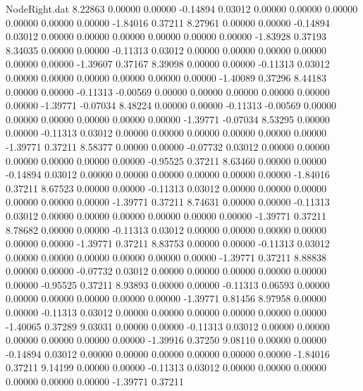 \begin{filecontents}{NodeRight.dat}
   8.22863    0.00000    0.00000    -0.14894    0.03012    0.00000    0.00000    0.00000    0.00000    0.00000    0.00000   -1.84016    0.37211
   8.27961    0.00000    0.00000    -0.14894    0.03012    0.00000    0.00000    0.00000    0.00000    0.00000    0.00000   -1.83928    0.37193
   8.34035    0.00000    0.00000    -0.11313    0.03012    0.00000    0.00000    0.00000    0.00000    0.00000    0.00000   -1.39607    0.37167
   8.39098    0.00000    0.00000    -0.11313    0.03012    0.00000    0.00000    0.00000    0.00000    0.00000    0.00000   -1.40089    0.37296
   8.44183    0.00000    0.00000    -0.11313   -0.00569    0.00000    0.00000    0.00000    0.00000    0.00000    0.00000   -1.39771   -0.07034
   8.48224    0.00000    0.00000    -0.11313   -0.00569    0.00000    0.00000    0.00000    0.00000    0.00000    0.00000   -1.39771   -0.07034
   8.53295    0.00000    0.00000    -0.11313    0.03012    0.00000    0.00000    0.00000    0.00000    0.00000    0.00000   -1.39771    0.37211
   8.58377    0.00000    0.00000    -0.07732    0.03012    0.00000    0.00000    0.00000    0.00000    0.00000    0.00000   -0.95525    0.37211
   8.63460    0.00000    0.00000    -0.14894    0.03012    0.00000    0.00000    0.00000    0.00000    0.00000    0.00000   -1.84016    0.37211
   8.67523    0.00000    0.00000    -0.11313    0.03012    0.00000    0.00000    0.00000    0.00000    0.00000    0.00000   -1.39771    0.37211
   8.74631    0.00000    0.00000    -0.11313    0.03012    0.00000    0.00000    0.00000    0.00000    0.00000    0.00000   -1.39771    0.37211
   8.78682    0.00000    0.00000    -0.11313    0.03012    0.00000    0.00000    0.00000    0.00000    0.00000    0.00000   -1.39771    0.37211
   8.83753    0.00000    0.00000    -0.11313    0.03012    0.00000    0.00000    0.00000    0.00000    0.00000    0.00000   -1.39771    0.37211
   8.88838    0.00000    0.00000    -0.07732    0.03012    0.00000    0.00000    0.00000    0.00000    0.00000    0.00000   -0.95525    0.37211
   8.93893    0.00000    0.00000    -0.11313    0.06593    0.00000    0.00000    0.00000    0.00000    0.00000    0.00000   -1.39771    0.81456
   8.97958    0.00000    0.00000    -0.11313    0.03012    0.00000    0.00000    0.00000    0.00000    0.00000    0.00000   -1.40065    0.37289
   9.03031    0.00000    0.00000    -0.11313    0.03012    0.00000    0.00000    0.00000    0.00000    0.00000    0.00000   -1.39916    0.37250
   9.08110    0.00000    0.00000    -0.14894    0.03012    0.00000    0.00000    0.00000    0.00000    0.00000    0.00000   -1.84016    0.37211
   9.14199    0.00000    0.00000    -0.11313    0.03012    0.00000    0.00000    0.00000    0.00000    0.00000    0.00000   -1.39771    0.37211

\end{filecontents}
